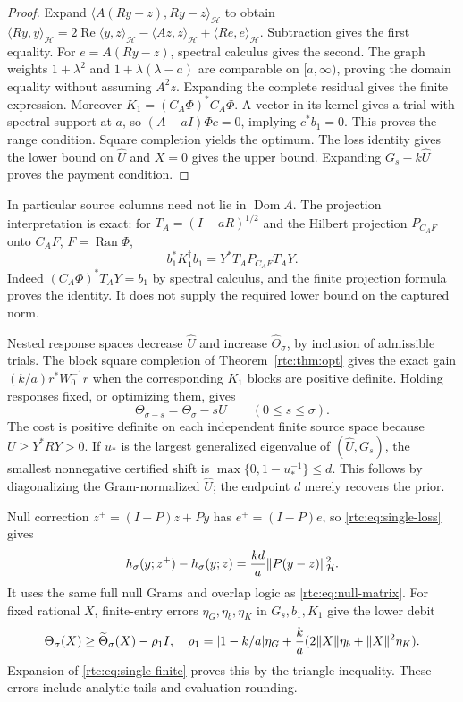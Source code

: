 \documentclass[11pt,a4paper]{article}
\numberwithin{equation}{section}
\theoremstyle{definition}\newtheorem{definition}[theorem]{Definition}
\theoremstyle{remark}\newtheorem{remark}[theorem]{Remark}
\newcommand{\Hh}{\mathcal H}\newcommand{\Hw}{\mathcal H}
\newcommand{\ip}[2]{\langle#1,#2\rangle}\newcommand{\norm}[1]{\lVert#1\rVert}\newcommand{\abs}[1]{\lvert#1\rvert}
\begin{document}
\begin{proof}
Expand $\ip{A(Ry-z)}{Ry-z}_{\Hh}$ to obtain
$\ip{Ry}y_{\Hh}=2\operatorname{Re}\ip y z_{\Hh}-\ip{Az}z_{\Hh}
+\ip{Re}e_{\Hh}$. Subtraction gives the first equality.
For $e=A(Ry-z)$, spectral calculus gives the second. The graph weights
$1+\lambda^2$ and $1+\lambda(\lambda-a)$ are comparable on
$[a,\infty)$, proving the domain equality without assuming $A^2z$.
Expanding the complete residual gives the finite expression.
Moreover $K_1=(C_A\Phi)^*C_A\Phi$. A vector in its kernel gives a trial
with spectral support at $a$, so $(A-aI)\Phi c=0$, implying $c^*b_1=0$.
This proves the range condition. Square completion yields the optimum.
The loss identity gives the lower bound on $\widehat U$ and $X=0$ gives
the upper bound. Expanding $G_s-k\widehat U$ proves the payment condition.
\end{proof}
In particular source columns need not lie in $\operatorname{Dom}A$.
The projection interpretation is exact: for
$T_A=(I-aR)^{1/2}$ and the Hilbert projection $P_{C_AF}$ onto
$C_AF$, $F=\operatorname{Ran}\Phi$,
\begin{equation}\label{rtc:eq:captured}
 b_1^*K_1^\dagger b_1=Y^*T_AP_{C_AF}T_AY.
\end{equation}
Indeed $(C_A\Phi)^*T_AY=b_1$ by spectral calculus, and the finite
projection formula proves the identity. It does not supply the required
lower bound on the captured norm.

Nested response spaces decrease $\widehat U$ and increase
$\widehat\Theta_\sigma$, by inclusion of admissible trials. The block
square completion of Theorem~\ref{rtc:thm:opt} gives the exact gain
$(k/a)r^*W_0^{-1}r$ when the corresponding $K_1$ blocks are positive
definite. Holding responses fixed, or optimizing them, gives
\begin{equation}\label{rtc:eq:single-shift}
 \Theta_{\sigma-s}=\Theta_\sigma-sU\qquad(0\le s\le\sigma).
\end{equation}
The cost is positive definite on each independent finite source space
because $U\ge Y^*RY>0$. If $u_*$ is the largest generalized eigenvalue
of $(\widehat U,G_s)$, the smallest nonnegative certified shift is
$\max\{0,1-u_*^{-1}\}\le d$. This follows by diagonalizing the
Gram-normalized $\widehat U$; the endpoint $d$ merely recovers the prior.

Null correction $z^+=(I-P)z+Py$ has $e^+=(I-P)e$, so
\eqref{rtc:eq:single-loss} gives
\begin{equation}\label{rtc:eq:single-null}
 h_\sigma(y;z^+)-h_\sigma(y;z)
 ={kd\over a}\norm{P(y-z)}_{\Hh}^2.
\end{equation}
It uses the same full null Grams and overlap logic as
\eqref{rtc:eq:null-matrix}. For fixed rational $X$, finite-entry errors
$\eta_G,\eta_b,\eta_K$ in $G_s,b_1,K_1$ give the lower debit
\begin{equation}\label{rtc:eq:single-round}
 \Theta_\sigma(X)\ge\widetilde\Theta_\sigma(X)-\rho_1I,
 \quad \rho_1=|1-k/a|\eta_G+{k\over a}
                    (2\norm X\eta_b+\norm X^2\eta_K).
\end{equation}
Expansion of \eqref{rtc:eq:single-finite} proves this by the triangle
inequality. These errors include analytic tails and evaluation rounding.
\end{document}
